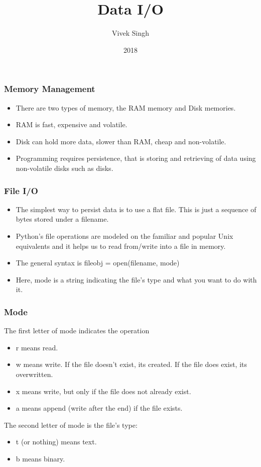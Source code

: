 \documentclass{beamer}
\title{Data I/O}
\author{Vivek Singh}
\institute{Information Systems Decision Sciences (ISDS)\\
MUMA College of Business\\
University of South Florida \\
Tampa, Florida}
\date{2018}
\begin{document}
\frame{\titlepage}

\begin{frame}
\frametitle{Memory Management}
\begin{itemize}
\item There are two types of memory, the RAM memory and Disk memories.
\item RAM is fast, expensive and volatile.
\item Disk can hold more data, slower than RAM, cheap and non-volatile.
\item Programming requires persistence, that is storing and retrieving of data using non-volatile disks such as disks.
\end{itemize}
\end{frame}

\begin{frame}
\frametitle{File I/O}
\begin{itemize}
\item The simplest way to persist data is to use a flat file. This is just a sequence of bytes stored under a filename.
\item Python's file operations are modeled on the familiar and popular Unix equivalents and it helps us to read from/write into a file in memory.
\item The general syntax is 
fileobj = open(filename, mode)
\item Here, mode is a string indicating the file’s type and what you want to do with it.

\end{itemize}
\end{frame}

\begin{frame}
\frametitle{Mode}
The first letter of mode indicates the operation
\begin{itemize}
\item r means read.
\item w means write. If the file doesn't exist, its created. If the file does exist, its overwritten.
\item x means write, but only if the file does not already exist.
\item a means append (write after the end) if the file exists.
\end{itemize}
The second letter of mode is the file’s type:
\begin{itemize}
\item t (or nothing) means text.
\item b means binary.
\end{itemize}
\end{frame}
\end{document}
